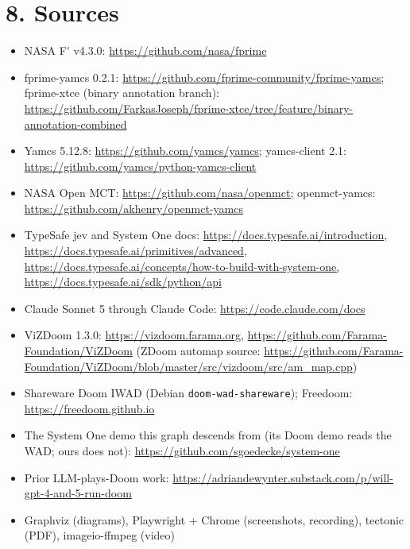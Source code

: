 \documentclass[11pt]{article}
\begin{document}
\FloatBarrier
\section*{8. Sources}
\begin{itemize}
  \item NASA F\'{} v4.3.0: \url{https://github.com/nasa/fprime}
  \item fprime-yamcs 0.2.1: \url{https://github.com/fprime-community/fprime-yamcs;} fprime-xtce (binary annotation branch): \url{https://github.com/FarkasJoseph/fprime-xtce/tree/feature/binary-annotation-combined}
  \item Yamcs 5.12.8: \url{https://github.com/yamcs/yamcs;} yamcs-client 2.1: \url{https://github.com/yamcs/python-yamcs-client}
  \item NASA Open MCT: \url{https://github.com/nasa/openmct;} openmct-yamcs: \url{https://github.com/akhenry/openmct-yamcs}
  \item TypeSafe jev and System One docs: \url{https://docs.typesafe.ai/introduction,} \url{https://docs.typesafe.ai/primitives/advanced,} \url{https://docs.typesafe.ai/concepts/how-to-build-with-system-one,} \url{https://docs.typesafe.ai/sdk/python/api}
  \item Claude Sonnet 5 through Claude Code: \url{https://code.claude.com/docs}
  \item ViZDoom 1.3.0: \url{https://vizdoom.farama.org,} \url{https://github.com/Farama-Foundation/ViZDoom} (ZDoom automap source: \url{https://github.com/Farama-Foundation/ViZDoom/blob/master/src/vizdoom/src/am_map.cpp})
  \item Shareware Doom IWAD (Debian \texttt{doom-wad-shareware}); Freedoom: \url{https://freedoom.github.io}
  \item The System One demo this graph descends from (its Doom demo reads the WAD; ours does not): \url{https://github.com/sgoedecke/system-one}
  \item Prior LLM-plays-Doom work: \url{https://adriandewynter.substack.com/p/will-gpt-4-and-5-run-doom}
  \item Graphviz (diagrams), Playwright + Chrome (screenshots, recording), tectonic (PDF), imageio-ffmpeg (video)
\end{itemize}
\FloatBarrier
\end{document}
